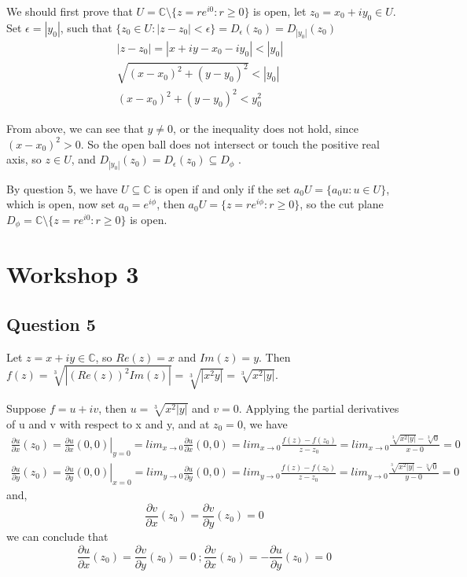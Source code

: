 \documentclass[11pt, oneside]{article}   	%
\begin{document}
We should first prove that \(U = \mathbb{C} \setminus \{z= re^{i0}: r\geq 0\}\) is open, let \(z_0 = x_0+iy_0\in U\). Set \(\epsilon = |y_0|\), such that \(\{z_0\in U:|z-z_0|< \epsilon\}= D_{\epsilon}(z_0) = D_{|y_0|}(z_0)\)
\begin{align*}
	|z-z_0| = |x+iy-x_0-iy_0| <|y_0|
	&
	\\
	\sqrt{(x-x_0)^2+(y-y_0)^2} < |y_0|
	\\
	(x-x_0)^2+(y-y_0)^2<y_0^2
\end{align*}

From above, we can see that \(y \not= 0\), or the inequality does not hold, since \((x-x_0)^2 >0\). So the open ball does not intersect or touch the positive real axis, so \(z\in U\), and \(D_{|y_0|}(z_0)= D_{\epsilon}(z_0) \subseteq D_{\phi}\) .

By question 5, we have \(U \subseteq \mathbb{C}\) is open if and only if the set \(a_0U = \{a_0u: u\in U\}\), which is open, now set \(a_0 = e^{i\phi}\), then \(a_0 U = \{z= re^{i\phi}: r\geq 0\}\), so the cut plane \(D_{\phi} = \mathbb{C} \setminus \{z= re^{i0}: r\geq 0\}\) is open.
	

\newpage

\section*{Workshop 3}

\subsection*{Question 5}
Let \(z=x+iy \in \mathbb{C}\), so \(Re(z) = x\) and \(Im(z) = y\). Then \(f(z) = \sqrt[3]{|(Re(z))^2Im(z)|} = \sqrt[3]{|x^2y|} = \sqrt[3]{x^2|y|}\).

Suppose \( f = u+iv\), then \(u = \sqrt[3]{x^2|y|}\) and \(v=0\). Applying the partial derivatives of u and v with respect to x and y, and at \(z_0 = 0\), we have 
\begin{align*}
	\left.\frac{\partial{u}}{\partial{x}}(z_0) = \frac{\partial{u}}{\partial{x}}(0,0) \right\vert_{y=0} = lim_{x\rightarrow0 }\frac{\partial{u}}{\partial{x}}(0,0) 
	= lim_{x\rightarrow0 }\frac{f(z) -f(z_0)}{z-z_0} = lim_{x\rightarrow0}\frac{\sqrt[3]{x^2|y|}-\sqrt[3]{0}}{x-0}=0 
	&
	\\
	\left.\frac{\partial{u}}{\partial{y}}(z_0) = \frac{\partial{u}}{\partial{y}}(0,0) \right\vert_{x=0} = lim_{y\rightarrow0 }\frac{\partial{u}}{\partial{y}}(0,0) 
	= lim_{y\rightarrow0 }\frac{f(z) -f(z_0)}{z-z_0} = lim_{y\rightarrow0}\frac{\sqrt[3]{x^2|y|}-\sqrt[3]{0}}{y-0}=0
\end{align*}
and,
\begin{equation*}
	\frac{\partial{v}}{\partial{x}}(z_0) = \frac{\partial{v}}{\partial{y}}(z_0) = 0
\end{equation*}
we can conclude that 
\begin{equation*}
	\frac{\partial{u}}{\partial{x}}(z_0)=\frac{\partial{v}}{\partial{y}}(z_0) = 0 \ ; \frac{\partial{v}}{\partial{x}}(z_0) = - \frac{\partial{u}}{\partial{y}}(z_0)=0
\end{equation*}
\end{document}
